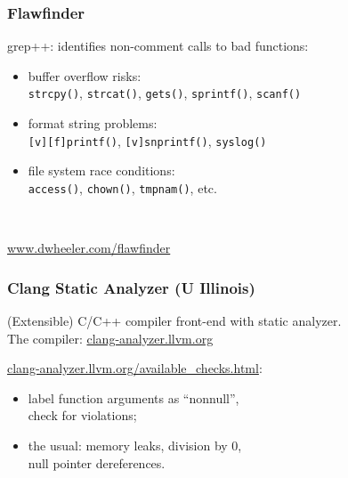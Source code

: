 \documentclass{beamer}
\newenvironment{changemargin}[1]{%
  \begin{list}{}{%
    \setlength{\topsep}{0pt}%
    \setlength{\leftmargin}{#1}%
    \setlength{\rightmargin}{1em}
    \setlength{\listparindent}{\parindent}%
    \setlength{\itemindent}{\parindent}%
    \setlength{\parsep}{\parskip}%
  }%
  \item[]}{\end{list}}
\begin{document}
\begin{frame}
  \frametitle{Flawfinder}
  \begin{changemargin}{1.5cm}
    grep++: identifies non-comment calls to bad functions:
    \begin{itemize}
    \item buffer overflow risks: \\ {\tt strcpy()}, {\tt strcat()}, {\tt gets()}, {\tt sprintf()}, {\tt scanf()}
    \item format string problems: \\
      {\tt [v][f]printf()}, {\tt [v]snprintf()}, {\tt syslog()}
    \item file system race conditions:\\
      {\tt access()}, {\tt chown()}, {\tt tmpnam()}, etc.
    \end{itemize}~\\[1em]
  \end{changemargin}
  \begin{center}
    \url{www.dwheeler.com/flawfinder}
  \end{center}
\end{frame}

\begin{frame}
  \frametitle{Clang Static Analyzer (U Illinois)}
  \begin{changemargin}{1.5cm}
    (Extensible) C/C++ compiler front-end with static analyzer.\\[1em]

    The compiler: \url{clang-analyzer.llvm.org}\\[2em]
    \end{changemargin}
 \hspace*{0.5cm}    \url{clang-analyzer.llvm.org/available_checks.html}:
  \begin{changemargin}{1.5cm}
    \begin{itemize}
    \item label function arguments as ``nonnull'', \\ check for violations;
    \item the usual: memory leaks, division by 0, \\ null pointer dereferences.
    \end{itemize}
  \end{changemargin}
\end{frame}
\end{document}
